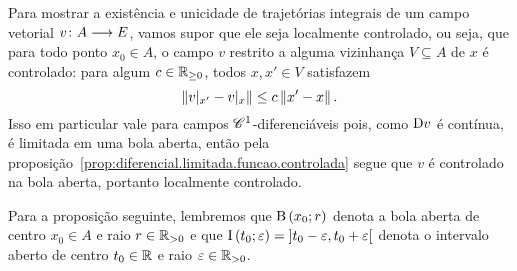 Para mostrar a existência e unicidade de trajetórias integrais de um campo vetorial $v\colon \allowbreak A \longrightarrow E$, vamos supor que ele seja localmente controlado, ou seja, que para todo ponto $x_0 \in A$, o campo $v$ restrito a alguma vizinhança $V \subseteq A$ de $x$ é controlado: para algum $c \in \mathbb{R}_{\geq 0}$, todos $x,x' \in V$ satisfazem
	\begin{equation*}
	\left\Vert{v|_{x'} - v|_{x}}\right\Vert \leq c \left\Vert{x'-x}\right\Vert.
	\end{equation*}
Isso em particular vale para campos $\mathscr{C}^1$-diferenciáveis pois, como $\mathrm{D} v$ é contínua, é limitada em uma bola aberta, então pela proposição~\ref{prop:diferencial.limitada.funcao.controlada} segue que $v$ é controlado na bola aberta, portanto localmente controlado.

Para a proposição seguinte, lembremos que $\mathrm{B}\left(x_0; r\right)$ denota a bola aberta de centro $x_0 \in A$ e raio $r \in \mathbb{R}_{>0}$ e que $\mathrm{I}\left(t_0; \varepsilon\right) = \left]t_0-\varepsilon,\allowbreak t_0+\varepsilon\right[$ denota o intervalo aberto de centro $t_0 \in \mathbb{R}$ e raio $\varepsilon \in \mathbb{R}_{>0}$.

